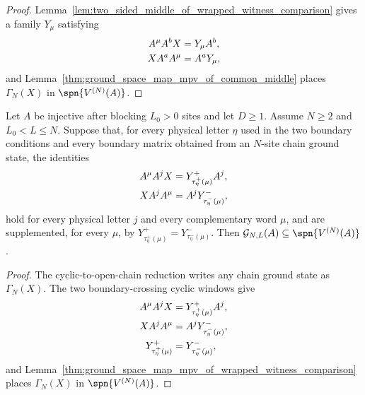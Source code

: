 \begin{proof}
    \leanok
    Lemma~\ref{lem:two_sided_middle_of_wrapped_witness_comparison} gives a
    family $Y_\mu$ satisfying
    \begin{align}
        A^\mu A^bX & = Y_\mu A^b, \notag \\
        XA^aA^\mu  & = A^aY_\mu, \notag
    \end{align}
    and Lemma~\ref{thm:ground_space_map_mpv_of_common_middle} places
    $\Gamma_N(X)$ in $\spn\{V^{(N)}(A)\}$.
\end{proof}

\begin{lemma}
    \label{thm:conditional_normal_range_reduction_witness_comparison}
    \leanok
    Let $A$ be injective after blocking $L_0>0$ sites and let $D \ge 1$. Assume
    $N \ge 2$ and $L_0 < L \le N$. Suppose that, for every physical letter
    $\eta$ used in the two boundary conditions and every boundary matrix
    obtained from an $N$-site chain ground state, the identities
    \begin{align}
        A^\mu A^j X & = Y^+_{\tau^+_\eta(\mu)}A^j, \notag \\
        X A^j A^\mu & = A^jY^-_{\tau^-_\eta(\mu)}, \notag
    \end{align}
    hold for every physical letter $j$ and every complementary word $\mu$, and
    are supplemented, for every $\mu$, by
    $Y^+_{\tau^+_\eta(\mu)} = Y^-_{\tau^-_\eta(\mu)}$.
    Then $\mathcal G_{N,L}(A)\subseteq \spn\{V^{(N)}(A)\}$.
\end{lemma}

\begin{proof}
    \leanok
    The cyclic-to-open-chain reduction writes any chain ground state as
    $\Gamma_N(X)$. The two boundary-crossing cyclic windows give
    \begin{align}
        A^\mu A^jX
         & = Y^+_{\tau^+_\eta(\mu)}A^j, \notag \\
        XA^jA^\mu
         & = A^jY^-_{\tau^-_\eta(\mu)}, \notag \\
        Y^+_{\tau^+_\eta(\mu)}
         & = Y^-_{\tau^-_\eta(\mu)}, \notag
    \end{align}
    and Lemma~\ref{thm:ground_space_map_mpv_of_wrapped_witness_comparison}
    places $\Gamma_N(X)$ in $\spn\{V^{(N)}(A)\}$.
\end{proof}
